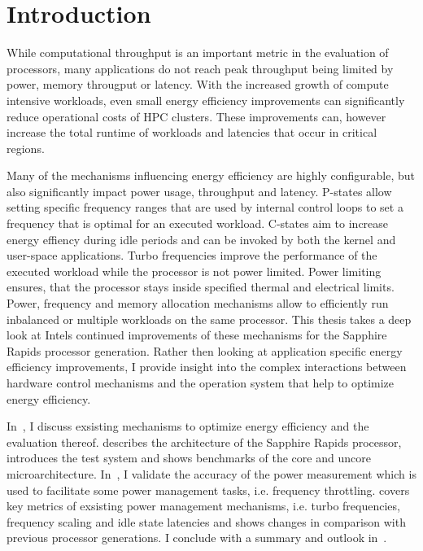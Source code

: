 \chapter{Introduction}
\label{sec:introduction}

While computational throughput is an important metric in the evaluation of processors, many applications do not reach peak throughput being limited by power, memory througput or latency.
With the increased growth of compute intensive workloads, even small energy efficiency improvements can significantly reduce operational costs of \ac{HPC} clusters.
These improvements can, however increase the total runtime of workloads and latencies that occur in critical regions.

Many of the mechanisms influencing energy efficiency are highly configurable, but also significantly impact power usage, throughput and latency.
P-states allow setting specific frequency ranges that are used by internal control loops to set a frequency that is optimal for an executed workload.
C-states aim to increase energy effiency during idle periods and can be invoked by both the kernel and user-space applications.
Turbo frequencies improve the performance of the executed workload while the processor is not power limited.
Power limiting ensures, that the processor stays inside specified thermal and electrical limits.
Power, frequency and memory allocation mechanisms allow to efficiently run inbalanced or multiple workloads on the same processor.
This thesis takes a deep look at Intels continued improvements of these mechanisms for the Sapphire Rapids processor generation.
Rather then looking at application specific energy efficiency improvements, I provide insight into the complex interactions between hardware control mechanisms and the operation system that help to optimize energy efficiency.

In~, I discuss exsisting mechanisms to optimize energy efficiency and the evaluation thereof.
 describes the architecture of the Sapphire Rapids processor, introduces the test system and shows benchmarks of the core and uncore microarchitecture.
In~, I validate the accuracy of the power measurement which is used to facilitate some power management tasks, i.e. frequency throttling.
 covers key metrics of exsisting power management mechanisms, i.e. turbo frequencies, frequency scaling and idle state latencies and shows changes in comparison with previous processor generations.
I conclude with a summary and outlook in~.